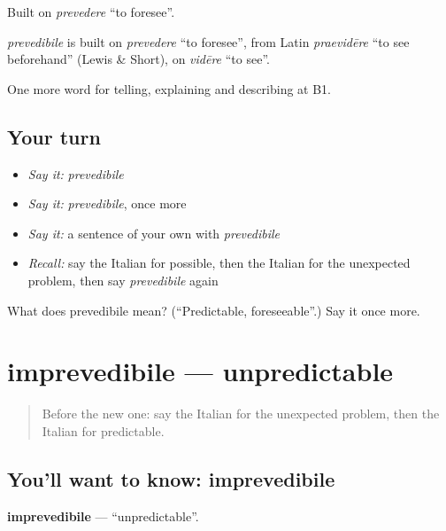 Built on \emph{prevedere} \textquotedblleft{}to foresee\textquotedblright{}.

\begin{cousinweb}
\emph{prevedibile} is built on \emph{prevedere} \textquotedblleft{}to foresee\textquotedblright{}, from Latin \emph{praevidēre} \textquotedblleft{}to see beforehand\textquotedblright{} (Lewis \& Short), on \emph{vidēre} \textquotedblleft{}to see\textquotedblright{}.
\end{cousinweb}

\begin{grammarlens}[title={What you've built}]
One more word for telling, explaining and describing at B1.
\end{grammarlens}

\subsection*{Your turn}
\begin{itemize}
\raggedright
  \item \emph{Say it:} \emph{prevedibile}
  \item \emph{Say it:} \emph{prevedibile}, once more
  \item \emph{Say it:} a sentence of your own with \emph{prevedibile}
  \item \emph{Recall:} say the Italian for possible, then the Italian for the unexpected problem, then say \emph{prevedibile} again
\end{itemize}

\begin{tcolorbox}[breakable,colback=teal!4,colframe=teal!35!black,title={Before you move on}]
What does prevedibile mean? (\textquotedblleft{}Predictable, foreseeable\textquotedblright{}.) Say it once more.
\end{tcolorbox}
\section[imprevedibile]{imprevedibile — unpredictable}

\label{lesson:IT-C374-imprevedibile}



\begin{quote}
Before the new one: say the Italian for the unexpected problem, then the Italian for predictable.
\end{quote}

\subsection*{You'll want to know: imprevedibile}
\textbf{imprevedibile} — \textquotedblleft{}unpredictable\textquotedblright{}.

